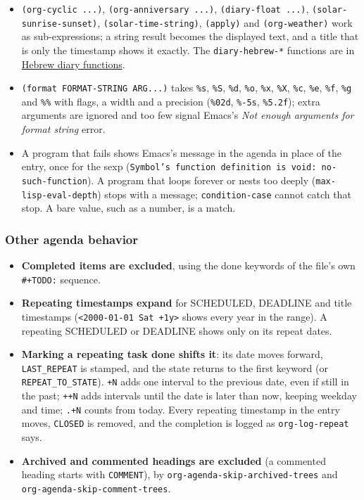 \documentclass[11pt]{article}
\begin{document}
\begin{itemize}
\item \texttt{(org-cyclic ...)}, \texttt{(org-anniversary ...)}, \texttt{(diary-float ...)}, \texttt{(solar-sunrise-sunset)}, \texttt{(solar-time-string)}, \texttt{(apply)} and \texttt{(org-weather)} work as sub-expressions; a string result becomes the displayed text, and a title that is only the timestamp shows it exactly. The \texttt{diary-hebrew-*} functions are in \hyperref[sec:org5058e69]{Hebrew diary functions}.
\item \texttt{(format FORMAT-STRING ARG...)} takes \texttt{\%s}, \texttt{\%S}, \texttt{\%d}, \texttt{\%o}, \texttt{\%x}, \texttt{\%X}, \texttt{\%c}, \texttt{\%e}, \texttt{\%f}, \texttt{\%g} and \texttt{\%\%} with flags, a width and a precision (\texttt{\%02d}, \texttt{\%-5s}, \texttt{\%5.2f}); extra arguments are ignored and too few signal Emacs's \emph{Not enough arguments for format string} error.
\item A program that fails shows Emacs's message in the agenda in place of the entry, once for the sexp (\texttt{Symbol’s function definition is void: no-such-function}). A program that loops forever or nests too deeply (\texttt{max-lisp-eval-depth}) stops with a message; \texttt{condition-case} cannot catch that stop. A bare value, such as a number, is a match.
\end{itemize}

\subsubsection{Other agenda behavior}
\label{sec:orgda57b1b}
\begin{itemize}
\item \textbf{Completed items are excluded}, using the done keywords of the file's own \texttt{\#+TODO:} sequence.
\item \textbf{Repeating timestamps expand} for SCHEDULED, DEADLINE and title timestamps (\texttt{<2000-01-01 Sat +1y>} shows every year in the range). A repeating SCHEDULED or DEADLINE shows only on its repeat dates.
\item \textbf{Marking a repeating task done shifts it}: its date moves forward, \texttt{LAST\_REPEAT} is stamped, and the state returns to the first keyword (or \texttt{REPEAT\_TO\_STATE}). \texttt{+N} adds one interval to the previous date, even if still in the past; \texttt{++N} adds intervals until the date is later than now, keeping weekday and time; \texttt{.+N} counts from today. Every repeating timestamp in the entry moves, \texttt{CLOSED} is removed, and the completion is logged as \texttt{org-log-repeat} says.
\item \textbf{Archived and commented headings are excluded} (a commented heading starts with \texttt{COMMENT}), by \texttt{org-agenda-skip-archived-trees} and \texttt{org-agenda-skip-comment-trees}.
\end{itemize}
\end{document}
